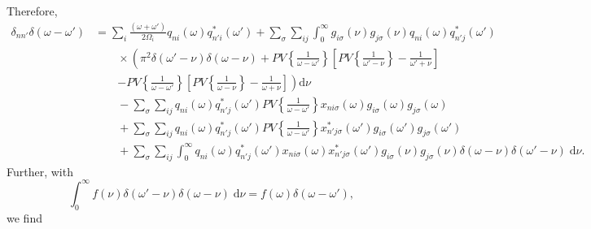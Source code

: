 Therefore,
\begin{equation}
\begin{split}
\delta_{nn'}\delta(\omega - \omega') &= \sum_i\frac{(\omega + \omega')}{2\Omega_i}q_{ni}(\omega)q_{n'i}^*(\omega') + \sum_\sigma\sum_{ij}\int_0^\infty g_{i\sigma}(\nu)g_{j\sigma}(\nu)q_{ni}(\omega)q_{n'j}^*(\omega')\\
&\qquad\times\left(\pi^2\delta(\omega' - \nu )\delta(\omega - \nu ) + PV\left\{\frac{1}{\omega - \omega'}\right\}\left[PV\left\{\frac{1}{\omega' - \nu }\right\} - \frac{1}{\omega' + \nu }\right]\right.\\
&\qquad\left. - PV\left\{\frac{1}{\omega - \omega'}\right\}\left[PV\left\{\frac{1}{\omega - \nu }\right\} - \frac{1}{\omega + \nu }\right]\right)\mathrm{d}\nu\\
&\qquad - \sum_{\sigma}\sum_{ij}q_{ni}(\omega)q_{n'j}^*(\omega')PV\left\{\frac{1}{\omega - \omega'}\right\}x_{ni\sigma}(\omega)g_{i\sigma}(\omega)g_{j\sigma}(\omega)\\
&\qquad + \sum_{\sigma}\sum_{ij}q_{ni}(\omega)q_{n'j}^*(\omega')PV\left\{\frac{1}{\omega - \omega'}\right\}x_{n'j\sigma}^*(\omega')g_{i\sigma}(\omega')g_{j\sigma}(\omega')\\
&\qquad + \sum_\sigma\sum_{ij}\int_0^\infty q_{ni}(\omega)q_{n'j}^*(\omega')x_{ni\sigma}(\omega)x_{n'j\sigma}^*(\omega')g_{i\sigma}(\nu)g_{j\sigma}(\nu)\delta(\omega - \nu )\delta(\omega' - \nu )\;\mathrm{d}\nu.
\end{split}
\end{equation}
Further, with
\begin{equation}
\int_0^\infty f(\nu)\delta(\omega' - \nu )\delta(\omega - \nu )\;\mathrm{d}\nu = f(\omega)\delta(\omega - \omega'),
\end{equation}
we find
